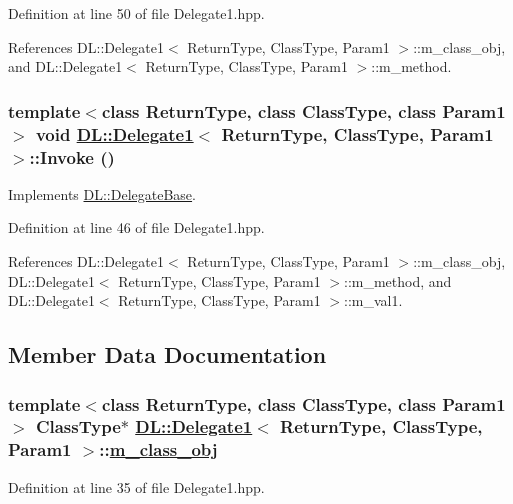Definition at line 50 of file Delegate1.hpp.

References DL::Delegate1$<$ Return\-Type, Class\-Type, Param1 $>$::m\_\-class\_\-obj, and DL::Delegate1$<$ Return\-Type, Class\-Type, Param1 $>$::m\_\-method.\hypertarget{classDL_1_1Delegate1_a2}{
\subsubsection[Invoke]{\setlength{\rightskip}{0pt plus 5cm}template$<$class Return\-Type, class Class\-Type, class Param1$>$ void \hyperlink{classDL_1_1Delegate1}{DL::Delegate1}$<$ Return\-Type, Class\-Type, Param1 $>$::Invoke ()}}
\label{classDL_1_1Delegate1_a2}




Implements \hyperlink{classDL_1_1DelegateBase_a2}{DL::Delegate\-Base}.

Definition at line 46 of file Delegate1.hpp.

References DL::Delegate1$<$ Return\-Type, Class\-Type, Param1 $>$::m\_\-class\_\-obj, DL::Delegate1$<$ Return\-Type, Class\-Type, Param1 $>$::m\_\-method, and DL::Delegate1$<$ Return\-Type, Class\-Type, Param1 $>$::m\_\-val1.

\subsection{Member Data Documentation}
\hypertarget{classDL_1_1Delegate1_r0}{
\subsubsection[m\_\-class\_\-obj]{\setlength{\rightskip}{0pt plus 5cm}template$<$class Return\-Type, class Class\-Type, class Param1$>$ Class\-Type$\ast$ \hyperlink{classDL_1_1Delegate1}{DL::Delegate1}$<$ Return\-Type, Class\-Type, Param1 $>$::\hyperlink{classDL_1_1Delegate1_r0}{m\_\-class\_\-obj}}}
\label{classDL_1_1Delegate1_r0}




Definition at line 35 of file Delegate1.hpp.

